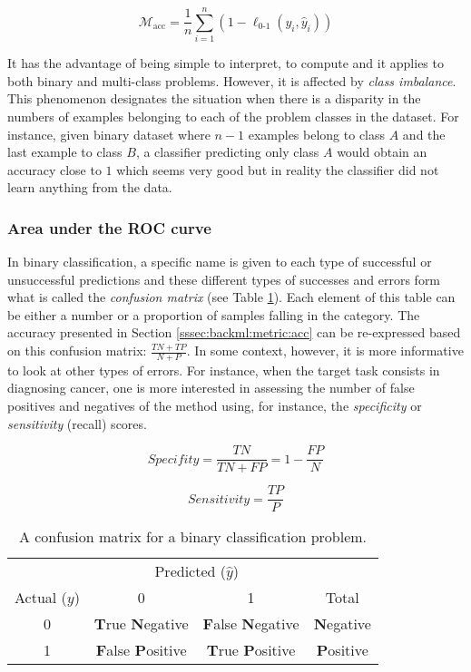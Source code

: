 \begin{equation}
\label{eqn:backml:accuracy}
\mathcal{M}_{\text{acc}} = \dfrac{1}{n} \sum\limits_{i = 1}^n (1 - \ell_{\text{0-1}}(y_i, \hat{y}_i))
\end{equation}

It has the advantage of being simple to interpret, to compute and it applies to
both binary and multi-class problems. However, it is affected by \textit{class imbalance}.
This phenomenon designates the situation when there is a disparity in the numbers
of examples belonging to each of the problem classes in the dataset. For instance,
given binary dataset where $n-1$ examples belong to class $A$ and the last example
to class $B$, a classifier predicting only class $A$ would obtain an accuracy
close to $1$ which seems very good but in reality the classifier did not learn
anything from the data.

\subsubsection{Area under the ROC curve}
\label{sssec:backml:metric:rocauc}

In binary classification, a specific name is given to each type of successful or
unsuccessful predictions and these different types of successes and errors form what is called
the \textit{confusion matrix} (see Table \ref{tab:backml:confusion}). Each element
of this table can be either a number or a proportion of samples falling in the
category. The accuracy presented in Section \ref{sssec:backml:metric:acc} can be
re-expressed based on this confusion matrix: $\frac{TN + TP}{N + P}$. In some
context, however, it is more informative to look at other types of errors. For
instance, when the target task consists in diagnosing cancer, one is more interested
in assessing the number of false positives and negatives of the method using, for
instance, the \textit{specificity} or \textit{sensitivity} (\aka recall) scores.

\begin{equation}
\label{eqn:backml:specifity}
\textit{Specifity} = \frac{TN}{TN + FP} = 1 - \frac{FP}{N}
\end{equation}

\begin{equation}
\label{eqn:backml:sensitivity}
\textit{Sensitivity} = \frac{TP}{P}
\end{equation}

\begin{table}
  \centering
  \begin{tabular}{c|cc|c}
  & \multicolumn{2}{c}{Predicted ($\hat{y}$)} & \\
  Actual ($y$) & 0 & 1 & Total \\
  \hline
  0 & \textbf{T}rue \textbf{N}egative & \textbf{F}alse \textbf{N}egative & \textbf{N}egative \\
  1 & \textbf{F}alse \textbf{P}ositive & \textbf{T}rue \textbf{P}ositive & \textbf{P}ositive \\
  \end{tabular}
  \caption{A confusion matrix for a binary classification problem.}
  \label{tab:backml:confusion}
\end{table}

